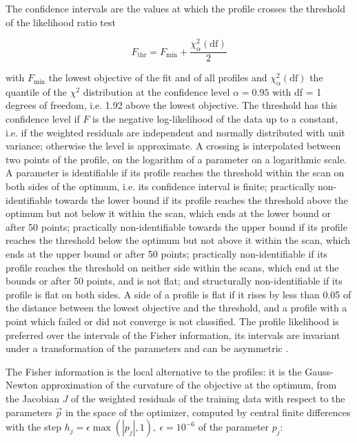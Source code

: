 \documentclass{article}
\begin{document}
The confidence intervals are the values at which the profile crosses the threshold of the likelihood ratio test

\begin{equation}
F_{\mathrm{thr}} = F_{\min} + \frac{\chi^2_{\alpha}(\mathrm{df})}{2}
\end{equation}

with $F_{\min}$ the lowest objective of the fit and of all profiles and $\chi^2_{\alpha}(\mathrm{df})$ the quantile of the $\chi^2$ distribution at the confidence level $\alpha = 0.95$ with df = 1 degrees of freedom, i.e. 1.92 above the lowest objective. The threshold has this confidence level if $F$ is the negative log-likelihood of the data up to a constant, i.e. if the weighted residuals are independent and normally distributed with unit variance; otherwise the level is approximate. A crossing is interpolated between two points of the profile, on the logarithm of a parameter on a logarithmic scale. A parameter is identifiable if its profile reaches the threshold within the scan on both sides of the optimum, i.e. its confidence interval is finite; practically non-identifiable towards the lower bound if its profile reaches the threshold above the optimum but not below it within the scan, which ends at the lower bound or after 50 points; practically non-identifiable towards the upper bound if its profile reaches the threshold below the optimum but not above it within the scan, which ends at the upper bound or after 50 points; practically non-identifiable if its profile reaches the threshold on neither side within the scans, which end at the bounds or after 50 points, and is not flat; and structurally non-identifiable if its profile is flat on both sides. A side of a profile is flat if it rises by less than 0.05 of the distance between the lowest objective and the threshold, and a profile with a point which failed or did not converge is not classified. The profile likelihood is preferred over the intervals of the Fisher information, its intervals are invariant under a transformation of the parameters and can be asymmetric \cite{Wieland2021}.

The Fisher information is the local alternative to the profiles: it is the Gauss-Newton approximation of the curvature of the objective at the optimum, from the Jacobian $J$ of the weighted residuals of the training data with respect to the parameters $\vec{p}$ in the space of the optimizer, computed by central finite differences with the step $h_j = \epsilon \max(|p_j|, 1),\ \epsilon = 10^{-6}$ of the parameter $p_j$:
\end{document}
